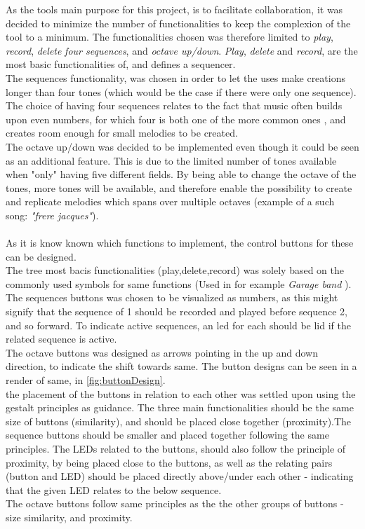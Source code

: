 As the tools main purpose for this project, is to facilitate collaboration, it was decided to minimize the number of functionalities to keep the complexion of the tool to a minimum. The functionalities chosen was therefore limited to \textit{play}, \textit{record}, \textit{delete} \textit{four sequences}, and \textit{octave up/down}. \textit{Play}, \textit{delete} and \textit{record}, are the most basic functionalities of, and defines a sequencer. \\
The sequences functionality, was chosen in order to let the uses make creations longer than four tones (which would be the case if there were only one sequence). The choice of having four sequences relates to the fact that music often builds upon even numbers, for which four is both one of the more common ones \cite{tempo}, and creates room enough for small melodies to be created. \\
The octave up/down was decided to be implemented even though it could be seen as an additional feature. This is due to the limited number of tones available when "only" having five different fields. By being able to change the octave of the tones, more tones will be available, and therefore enable the possibility to create and replicate melodies which spans over multiple octaves (example of a such song: \textit{"frere jacques"}).
\\\\
As it is know known which functions to implement, the control buttons for these can be designed.\\
The tree most bacis functionalities (play,delete,record) was solely based on the commonly used symbols for same functions (Used in for example \textit{Garage band} \cite{Garageband}). \\The sequences buttons was chosen to be visualized as numbers, as this might signify that the sequence of 1 should be recorded and played before sequence 2, and so forward. To indicate active sequences, an led for each should be lid if the related sequence is active. \\ The octave buttons was designed as arrows pointing in the up and down direction, to indicate the shift towards same. The button designs can be seen in a render of same, in \autoref{fig:buttonDesign}. \\ the placement of the buttons in relation to each other was settled upon using the gestalt principles \cite{gestalt} as guidance. The three main functionalities should be the same size of buttons (similarity\cite{gestalt}), and should be placed close together (proximity\cite{gestalt}).The sequence buttons should be smaller and placed together following the same principles. The LEDs related to the buttons, should also follow the principle of proximity, by being placed close to the buttons, as well as the relating pairs (button and LED) should be placed directly above/under each other - indicating that the given LED relates to the below sequence. \\ The octave buttons follow same principles as the the other groups of buttons - size similarity, and proximity.    
 

